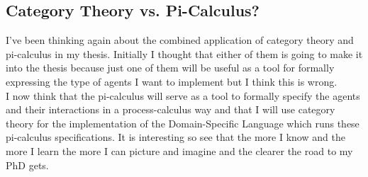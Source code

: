 \subsection*{Category Theory vs. Pi-Calculus?}
I've been thinking again about the combined application of category theory and pi-calculus in my thesis. Initially I thought that either of them is going to make it into the thesis because just one of them will be useful as a tool for formally expressing the type of agents I want to implement but I think this is wrong. \\
I now think that the pi-calculus will serve as a tool to formally specify the agents and their interactions in a process-calculus way and that I will use category theory for the implementation of the Domain-Specific Language which runs these pi-calculus specifications.
\medskip
It is interesting so see that the more I know and the more I learn the more I can picture and imagine and the clearer the road to my PhD gets.

